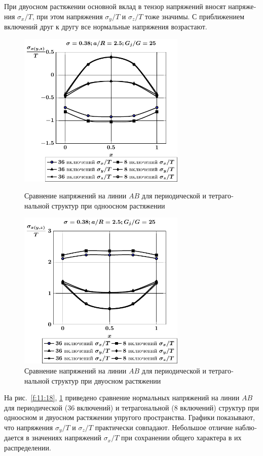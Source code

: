 \begin{russian}
При двуосном растяжении основной вклад в тензор напряжений вносят напряжения $\sigma_x/T$, при этом напряжения $\sigma_y/T$ и $\sigma_z/T$ тоже значимы. С приближением включений друг к другу все нормальные напряжения возрастают.

\begin{figure}[h!]
\centering\footnotesize
\parbox[b]{7.5cm}{\centering\includegraphics[width=8cm]{spheres-inc27-8-a25-g25-t1.pdf}
\caption{Сравнение напряжений на линии $AB$ для периодической и тетрагональной структур при одноосном растяжении
\label{f:11:18}}}\hfil\hfil
\parbox[b]{7.5cm}{\centering\includegraphics[width=8cm]{spheres-inc27-8-a25-g25-t2.pdf}
\caption{Сравнение напряжений на линии $AB$ для периодической и тетрагональной структур при двуосном растяжении
\label{f:11:19}}}
\end{figure}

На рис.~\ref{f:11:18}, \ref{f:11:19} приведено сравнение нормальных напряжений на линии $AB$ для периодической (36 включений) и тетрагональной (8 включений) структур при одноосном и двуосном растяжении упругого пространства. Графики показывают, что напряжения $\sigma_y/T$ и $\sigma_z/T$ практически совпадают. Небольшое отличие наблюдается в значениях напряжений $\sigma_x/T$ при сохранении общего характера в их распределении.



\end{russian}
